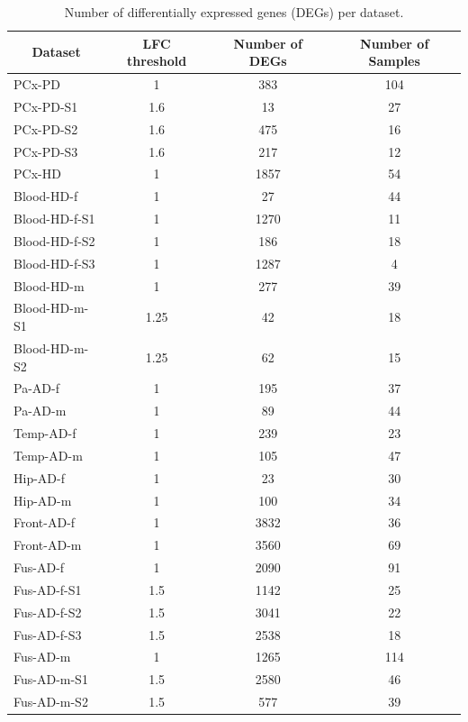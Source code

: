 \begin{table}[!ht]
\centering
\caption{Number of differentially expressed genes (DEGs) per dataset.}
\label{tab:de-genes}
\begin{tabular}{lccc}
\hline
\multicolumn{1}{c}{\textbf{Dataset}} & \textbf{LFC threshold} & \textbf{Number of DEGs} & \textbf{Number of Samples} \\ \hline
PCx-PD        & 1    & 383  & 104 \\
PCx-PD-S1     & 1.6  & 13   & 27  \\
PCx-PD-S2     & 1.6  & 475  & 16  \\
PCx-PD-S3     & 1.6  & 217  & 12  \\
PCx-HD        & 1    & 1857 & 54  \\
Blood-HD-f    & 1    & 27   & 44  \\
Blood-HD-f-S1 & 1    & 1270 & 11  \\
Blood-HD-f-S2 & 1    & 186  & 18  \\
Blood-HD-f-S3 & 1    & 1287 & 4   \\
Blood-HD-m    & 1    & 277  & 39  \\
Blood-HD-m-S1 & 1.25 & 42   & 18  \\
Blood-HD-m-S2 & 1.25 & 62   & 15  \\
Pa-AD-f       & 1    & 195  & 37  \\
Pa-AD-m       & 1    & 89   & 44  \\
Temp-AD-f     & 1    & 239  & 23  \\
Temp-AD-m     & 1    & 105  & 47  \\
Hip-AD-f      & 1    & 23   & 30  \\
Hip-AD-m      & 1    & 100  & 34  \\
Front-AD-f    & 1    & 3832 & 36  \\
Front-AD-m    & 1    & 3560 & 69  \\
Fus-AD-f      & 1    & 2090 & 91  \\
Fus-AD-f-S1   & 1.5  & 1142 & 25  \\
Fus-AD-f-S2   & 1.5  & 3041 & 22  \\
Fus-AD-f-S3   & 1.5  & 2538 & 18  \\
Fus-AD-m      & 1    & 1265 & 114 \\
Fus-AD-m-S1   & 1.5  & 2580 & 46  \\
Fus-AD-m-S2   & 1.5  & 577  & 39   \\ \hline
\end{tabular}
\end{table}

